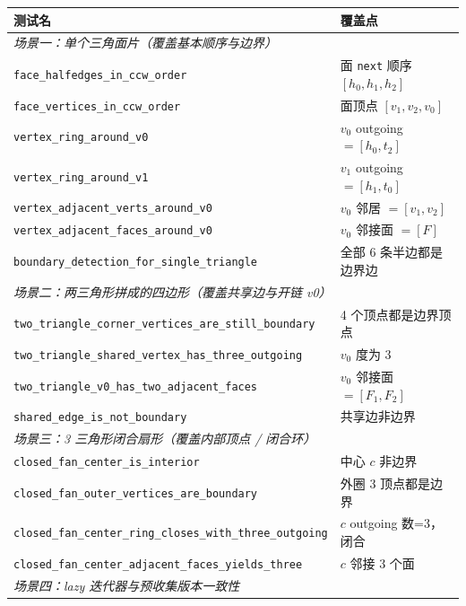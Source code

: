 \documentclass[11pt,a4paper]{article}
\begin{document}
{\scriptsize
\renewcommand{\arraystretch}{1.18}
\begin{longtable}{@{}ll@{}}
  \toprule
  \textbf{测试名} & \textbf{覆盖点} \\
  \midrule
  \endhead
  \multicolumn{2}{l}{\textit{场景一：单个三角面片（覆盖基本顺序与边界）}} \\
  \texttt{face\_halfedges\_in\_ccw\_order}       & 面 \texttt{next} 顺序 $[h_0,h_1,h_2]$ \\
  \texttt{face\_vertices\_in\_ccw\_order}        & 面顶点 $[v_1,v_2,v_0]$ \\
  \texttt{vertex\_ring\_around\_v0}              & $v_0$ outgoing $=[h_0,t_2]$ \\
  \texttt{vertex\_ring\_around\_v1}              & $v_1$ outgoing $=[h_1,t_0]$ \\
  \texttt{vertex\_adjacent\_verts\_around\_v0}   & $v_0$ 邻居 $=[v_1,v_2]$ \\
  \texttt{vertex\_adjacent\_faces\_around\_v0}   & $v_0$ 邻接面 $=[F]$ \\
  \texttt{boundary\_detection\_for\_single\_triangle} & 全部 6 条半边都是边界边 \\
  \midrule
  \multicolumn{2}{l}{\textit{场景二：两三角形拼成的四边形（覆盖共享边与开链 v0）}} \\
  \texttt{two\_triangle\_corner\_vertices\_are\_still\_boundary} & 4 个顶点都是边界顶点 \\
  \texttt{two\_triangle\_shared\_vertex\_has\_three\_outgoing}   & $v_0$ 度为 3 \\
  \texttt{two\_triangle\_v0\_has\_two\_adjacent\_faces}          & $v_0$ 邻接面 $=[F_1,F_2]$ \\
  \texttt{shared\_edge\_is\_not\_boundary}                       & 共享边非边界 \\
  \midrule
  \multicolumn{2}{l}{\textit{场景三：3 三角形闭合扇形（覆盖内部顶点 / 闭合环）}} \\
  \texttt{closed\_fan\_center\_is\_interior}                       & 中心 $c$ 非边界 \\
  \texttt{closed\_fan\_outer\_vertices\_are\_boundary}             & 外圈 3 顶点都是边界 \\
  \texttt{closed\_fan\_center\_ring\_closes\_with\_three\_outgoing} & $c$ outgoing 数=3，闭合 \\
  \texttt{closed\_fan\_center\_adjacent\_faces\_yields\_three}     & $c$ 邻接 3 个面 \\
  \midrule
  \multicolumn{2}{l}{\textit{场景四：lazy 迭代器与预收集版本一致性}} \\

\end{longtable}}
\end{document}
